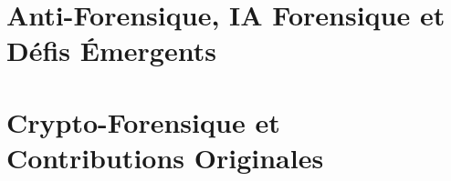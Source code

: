 \documentclass[12pt, twoside, openright, a4paper]{book}
\begin{document}
        
      
        
       
        
       
        
      
        
      
        
       
        
     

    \part{Anti-Forensique, IA Forensique et Défis Émergents}
    \label{part:avance}

        
   
        
      
        
    
        
    
    \part{Crypto-Forensique et Contributions Originales}
    \label{part:crypto}

        
    
        
    
        
     
        
    
\end{document}
